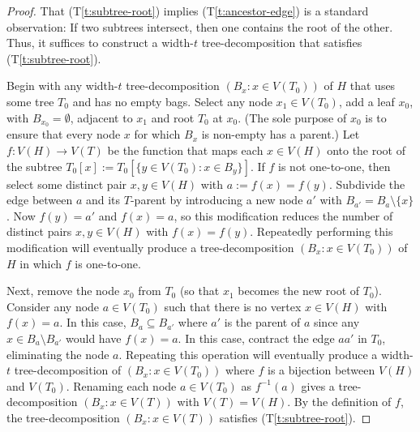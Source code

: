\documentclass{patmorin}
\theoremstyle{plain}
\theoremstyle{definition}
\newcommand{\tref}[1]{(T\ref{t:#1})}
\begin{document}
\begin{proof}
  That \tref{subtree-root} implies \tref{ancestor-edge} is a standard observation: If two subtrees intersect, then one contains the root of the other.  Thus, it suffices to construct a width-$t$ tree-decomposition that satisfies \tref{subtree-root}.

  Begin with any width-$t$ tree-decomposition $(B_x:x\in V(T_0))$ of $H$ that uses some tree $T_0$ and has no empty bags.  Select any node $x_1\in V(T_0)$, add a leaf $x_0$, with $B_{x_0}=\emptyset$, adjacent to $x_1$ and root $T_0$ at $x_0$. (The sole purpose of $x_0$ is to ensure that every node $x$ for which $B_x$ is non-empty has a parent.)  Let $f:V(H)\to V(T)$ be the function that maps each $x\in V(H)$ onto the root of the subtree $T_0[x]:=T_0[\{y\in V(T_0): x\in B_y\}]$.  If $f$ is not one-to-one, then select some distinct pair $x,y\in V(H)$ with $a:=f(x)=f(y)$.  Subdivide the edge between $a$ and its $T$-parent by introducing a new node $a'$ with $B_{a'}=B_{a}\setminus\{x\}$. Now $f(y)=a'$ and $f(x)=a$, so this modification reduces the number of distinct pairs $x,y\in V(H)$ with $f(x)=f(y)$.  Repeatedly performing this modification will eventually produce a tree-decomposition $(B_x:x\in V(T_0))$ of $H$ in which $f$ is one-to-one.

  Next, remove the node $x_0$ from $T_0$ (so that $x_1$ becomes the new root of $T_0$).  Consider any node $a\in V(T_0)$ such that there is no vertex $x\in V(H)$ with $f(x)=a$.  In this case, $B_{a}\subseteq B_{a'}$ where $a'$ is the parent of $a$ since any $x\in B_a\setminus B_{a'}$ would have $f(x)=a$.  In this case, contract the edge $aa'$ in $T_0$, eliminating the node $a$.  Repeating this operation will eventually produce a width-$t$ tree-decomposition of $(B_x:x\in V(T_0))$ where $f$ is a bijection between $V(H)$ and $V(T_0)$.  Renaming each node $a\in V(T_0)$ as $f^{-1}(a)$ gives a tree-decomposition $(B_x:x\in V(T))$ with $V(T)=V(H)$.  By the definition of $f$, the tree-decomposition $(B_x:x\in V(T))$ satisfies \tref{subtree-root}.
\end{proof}
\end{document}
